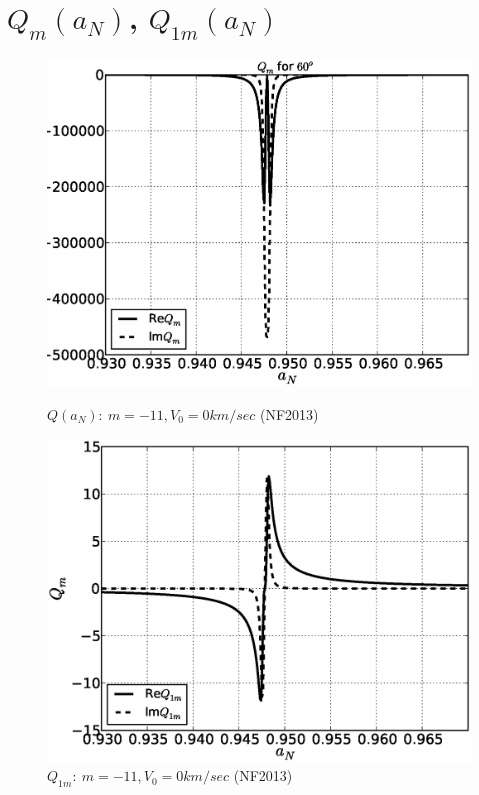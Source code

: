 \documentclass[11pt,oneside,a4paper,notitlepage]{article}
\begin{document}
\section{$Q_m(a_N)$, $Q_{1m}(a_N)$}
\begin{figure}[h]
\begin{center}
\begin{minipage}[h]{0.4\linewidth}
 \includegraphics[width=1.4\linewidth]{evans60/Q60.eps}
 \caption{$Q(a_N):~m=-11,V_{0}=0km/sec$ (NF2013)}
 \label{fig:Q60}
\end{minipage}
\hfill
\begin{minipage}[h]{0.4\linewidth}
 \includegraphics[width=1.4\linewidth]{evans60/Q1_60.eps}
 \caption{$Q_{1m}:~m=-11,V_{0}=0km/sec$ (NF2013)}
 \label{fig:Q160}
\end{minipage}
\end{center}
\end{figure}
\end{document}
